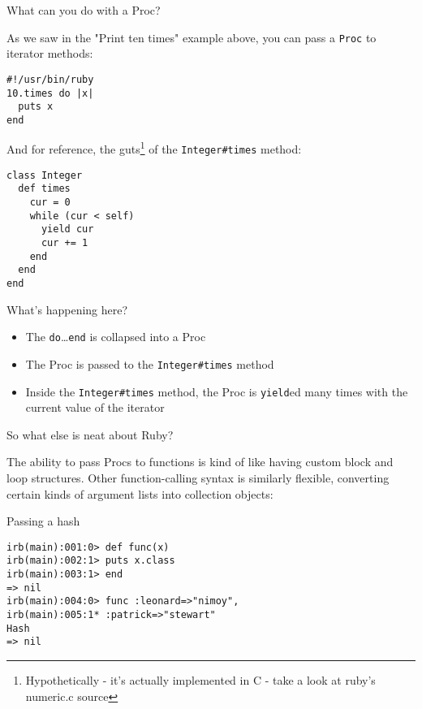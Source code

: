 \documentclass{slides}
\newcommand{\sh}[1]{
	{\Large #1}
	
}
\newcommand{\subh}[1]{
	{\large #1}
	
}
\begin{document}
\begin{slide}
\sh{What can you do with a Proc?}
As we saw in the "Print ten times" example above, you can pass a \verb|Proc| to iterator methods:
\begin{verbatim}
#!/usr/bin/ruby
10.times do |x|
  puts x
end
\end{verbatim}
And for reference, the guts\footnote{Hypothetically - it's actually implemented in C - take a look at ruby's numeric.c source} of the \verb|Integer#times| method:
\begin{verbatim}
class Integer
  def times
    cur = 0
    while (cur < self)
      yield cur
      cur += 1
    end
  end
end
\end{verbatim}
\end{slide}

\begin{slide}
What's happening here?
\begin{itemize}
\item The \verb|do|\ldots\verb|end| is collapsed into a Proc
\item The Proc is passed to the \verb|Integer#times| method
\item Inside the \verb|Integer#times| method, the Proc is \verb|yield|ed many times with the current value of the iterator
\end{itemize}
\end{slide}

\begin{slide}
\sh{So what else is neat about Ruby?}
The ability to pass Procs to functions is kind of like having custom block and loop structures.  Other function-calling syntax is similarly flexible, converting certain kinds of argument lists into collection objects:

\subh{Passing a hash}
\begin{verbatim}
irb(main):001:0> def func(x)
irb(main):002:1> puts x.class
irb(main):003:1> end
=> nil
irb(main):004:0> func :leonard=>"nimoy",
irb(main):005:1* :patrick=>"stewart"
Hash
=> nil
\end{verbatim}
\end{slide}
\end{document}
